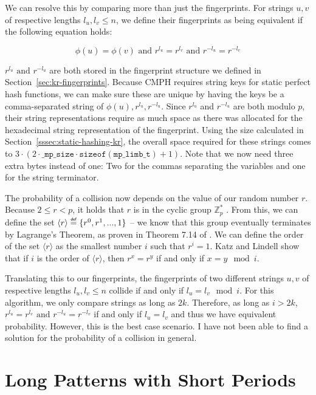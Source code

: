 \documentclass[ %
                    author={Dominic Joseph Moylett},
                    degree={MEng},
                     title={Dictionary Matching with Fingerprints},
                  subtitle={An Empirical Analysis},
                      type={research},
                      year={2015} ]{dissertation}
\begin{document}
We can resolve this by comparing more than just the fingerprints. For strings $u, v$ of respective lengths $l_u, l_v \leq n$, we define their fingerprints as being equivalent if the following equation holds:

$$\phi(u) = \phi(v) \text{ and } r^{l_u} = r^{l_v} \text{ and } r^{-l_u} = r^{-l_v}$$

$r^{l_u} \text{ and } r^{-l_u}$ are both stored in the fingerprint structure we defined in Section~\ref{sec:kr-fingerprints}. Because CMPH requires string keys for static perfect hash functions, we can make sure these are unique by having the keys be a comma-separated string of $\phi(u),r^{l_u},r^{-l_u}$. Since $r^{l_u}$ and $r^{-l_u}$ are both modulo $p$, their string representations require as much space as there was allocated for the hexadecimal string representation of the fingerprint. Using the size calculated in Section~\ref{sssec:static-hashing-kr}, the overall space required for these strings comes to $3 \cdot (2 \cdot \texttt{\_mp\_size} \cdot \texttt{sizeof}(\texttt{mp\_limb\_t}) + 1)$. Note that we now need three extra bytes instead of one: Two for the commas separating the variables and one for the string terminator.

The probability of a collision now depends on the value of our random number $r$. Because $2 \leq r < p$, it holds that $r$ is in the cyclic group $\mathbb{Z}^*_p$ \cite[pp 254-256]{katz}. From this, we can define the set $\langle r \rangle \defeq \{r^0, r^1,...,1\}$ -- we know that this group eventually terminates by Lagrange's Theorem, as proven in Theorem 7.14 of \cite[p 253]{katz}. We can define the order of the set $\langle r \rangle$ as the smallest number $i$ such that $r^i = 1$. Katz and Lindell \cite[pp 274-277]{katz} show that if $i$ is the order of $\langle r \rangle$, then $r^x = r^y$ if and only if $x = y \mod i$.

Translating this to our fingerprints, the fingerprints of two different strings $u, v$ of respective lengths $l_u, l_v \leq n$ collide if and only if $l_u = l_v \mod i$. For this algorithm, we only compare strings as long as $2k$. Therefore, as long as $i > 2k$, $r^{l_u} = r^{l_v} \text{ and } r^{-l_u} = r^{-l_v}$ if and only if $l_u = l_v$ and thus we have equivalent probability. However, this is the best case scenario. I have not been able to find a solution for the probability of a collision in general.

\section{Long Patterns with Short Periods}
\label{sec:impl-periodic}
\end{document}
